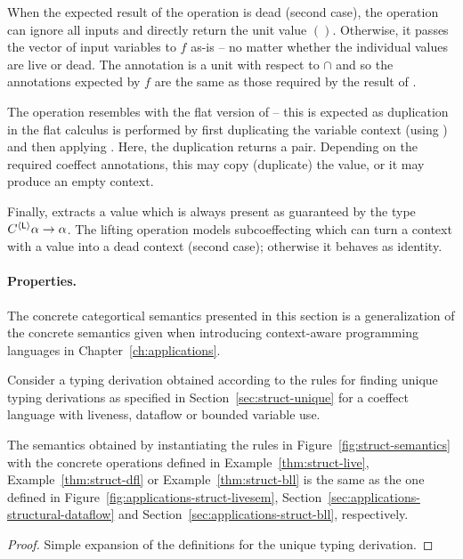 \noindent
When the expected result of the  operation is dead (second case), the operation can
ignore all inputs and directly return the unit value $()$. Otherwise, it passes the vector of
input variables to $f$ as-is -- no matter whether the individual values are live or dead. The
 annotation is a unit with respect to $\cap$ and so the annotations expected by $f$ are
the same as those required by the result of .

The  operation resembles with the flat version of  -- this is expected as
duplication in the flat calculus is performed by first duplicating the variable context (using
) and then applying . Here, the duplication returns a pair. Depending on the
required coeffect annotations, this may copy (duplicate) the value, or it may produce an empty context.

Finally,  extracts a value which is always present as guaranteed by the type
$C^{\langle \textnormal{\sffamily L} \rangle}\alpha \rightarrow \alpha$. The lifting operation models
subcoeffecting which can turn a context with a value into a dead context (second case); otherwise
it behaves as identity.

\paragraph{Properties.}
The concrete categortical semantics presented in this section is a generalization of the concrete
semantics given when introducing context-aware programming languages in Chapter~\ref{ch:applications}.

\begin{theorem}[Generalization]
\label{thm:struct-generalization}

Consider a typing derivation obtained according to the rules for finding unique typing derivations
as specified in Section~\ref{sec:struct-unique} for a coeffect language with liveness, dataflow or
bounded variable use.

The semantics obtained by instantiating the rules in Figure~\ref{fig:struct-semantics} with the
concrete operations defined in Example~\ref{thm:struct-live},
Example~\ref{thm:struct-dfl} or Example~\ref{thm:struct-bll} is the
same as the one defined in Figure~\ref{fig:applications-struct-livesem},
Section~\ref{sec:applications-structural-dataflow} and Section~\ref{sec:applications-struct-bll},
respectively.
\end{theorem}
\begin{proof}
Simple expansion of the definitions for the unique typing derivation.
\end{proof}


